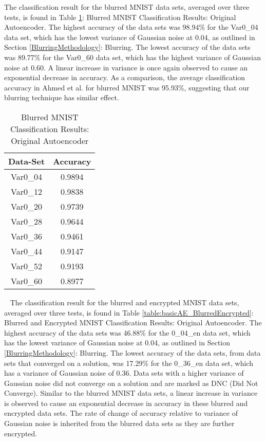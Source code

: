 \documentclass[12pt, titlepage]{article}
\begin{document}
\noindent The classification result for the blurred MNIST data sets, averaged over three tests, is found in Table \ref{table:basicAE_Blurred}: Blurred MNIST Classification Results: Original Autoencoder. The highest accuracy of the data sets was 98.94\% for the Var0\_04 data set, which has the lowest variance of Gaussian noise at 0.04, as outlined in Section \ref{BlurringMethodology}: Blurring. The lowest accuracy of the data sets was 89.77\% for the Var0\_60 data set, which has the highest variance of Gaussian noise at 0.60. A linear increase in variance is once again observed to cause an exponential decrease in accuracy. As a comparison, the average classification accuracy in Ahmed et al. for blurred MNIST was 95.93\%, suggesting that our blurring technique has similar effect.

\begin{table}[!h]
	\begin{center}
		\begin{tabular}{| c | c |}
			\hline
			\textbf{Data-Set} & \textbf{Accuracy}\\
			\hline
			Var0\_04 & 0.9894\\
			\hline
			Var0\_12 & 0.9838\\
			\hline
			Var0\_20 & 0.9739\\
			\hline
			Var0\_28 & 0.9644\\
			\hline
			Var0\_36 & 0.9461\\
			\hline
			Var0\_44 & 0.9147\\
			\hline
			Var0\_52 & 0.9193\\
			\hline
			Var0\_60 & 0.8977\\
			\hline
		\end{tabular}
		\caption{Blurred MNIST Classification Results: Original Autoencoder}
		\label{table:basicAE_Blurred}
	\end{center}
\end{table}

~\newpage
\noindent The classification result for the blurred and encrypted MNIST data sets, averaged over three tests, is found in Table \ref{table:basicAE_BlurredEncrypted}: Blurred and Encrypted MNIST Classification Results: Original Autoencoder. The highest accuracy of the data sets was 46.88\% for the 0\_04\_en data set, which has the lowest variance of Gaussian noise at 0.04, as outlined in Section \ref{BlurringMethodology}: Blurring. The lowest accuracy of the data sets, from data sets that converged on a solution, was 17.29\% for the 0\_36\_en data set, which has a variance of Gaussian noise of 0.36. Data sets with a higher variance of Gaussian noise did not converge on a solution and are marked as DNC (Did Not Converge). Similar to the blurred MNIST data sets, a linear increase in variance is observed to cause an exponential decrease in accuracy in these blurred and encrypted data sets. The rate of change of accuracy relative to variance of Gaussian noise is inherited from the blurred data sets as they are further encrypted.\\ 
\end{document}
